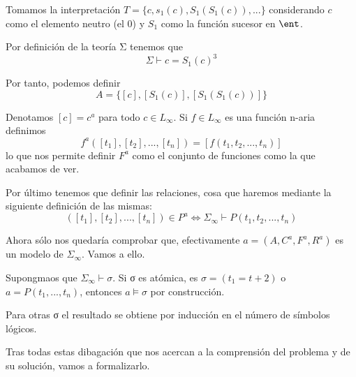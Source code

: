 \begin{enumerate}
\begin{enumerate}
\begin{example}
Tomamos la interpretación $T=\{c,s_1(c),S_1(S_1(c)),...\}$ considerando $c$ como el elemento neutro (el 0) y $S_1$ como la función sucesor en $\ent$.

Por definición de la teoría Σ tenemos que
\[Σ \vdash c = S_1(c)^3\]

Por tanto, podemos definir
\[A=\{[c],[S_1(c)], [S_1(S_1(c))]\}\]

Denotamos $[c]=c^a$ para todo $c\in L_{\infty}$. Si $f \in L_{\infty}$ es una función n-aria definimos
\[f^a([t_1],[t_2],...,[t_n]) = [f(t_1,t_2,...,t_n)]\]
lo que nos permite definir $F^a$ como el conjunto de funciones como la que acabamos de ver.

Por último tenemos que definir las relaciones, cosa que haremos mediante la siguiente definición de las mismas:
\[([t_1],[t_2],...,[t_n])\in P^a \iff Σ_{\infty} \vdash P(t_1,t_2,...,t_n)\]

Ahora sólo nos quedaría comprobar que, efectivamente $a=(A,C^a,F^a,R^a)$ es un modelo de $Σ_{\infty}$. Vamos a ello.

Supongmaos que $Σ_{\infty}\vdash σ$. Si σ es atómica, es $σ=(t_1=t+2)$ o $a=P(t_1,...,t_n)$, entonces $a \vDash σ$ por construcción.

Para otras σ el resultado se obtiene por inducción en el número de símbolos lógicos.

\end{example}
\end{enumerate}

\end{enumerate}


Tras todas estas dibagación que nos acercan a la comprensión del problema y de su solución, vamos a formalizarlo.

